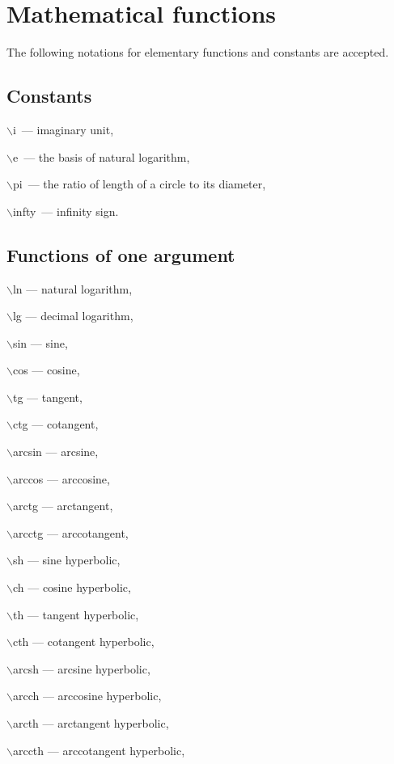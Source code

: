 \section{Mathematical functions}
The following notations for elementary functions and constants are accepted.
\subsection{Constants}  
\hspace*{4mm}  $\backslash$i~--- imaginary unit, 

 $\backslash$e~--- the basis of natural logarithm,  

 $\backslash$pi~--- the ratio of length of a circle to its diameter,    

 $\backslash$infty~--- infinity sign. 


\subsection{Functions of one argument} 

\hspace*{4mm} $\backslash$ln --- natural logarithm, 

 $\backslash$lg --- decimal logarithm, 

 $\backslash$sin --- sine,  

 $\backslash$cos --- cosine,  

 $\backslash$tg --- tangent,  

 $\backslash$ctg --- cotangent, 

 $\backslash$arcsin --- arcsine, 

 $\backslash$arccos --- arccosine,  

 $\backslash$arctg --- arctangent,  

 $\backslash$arcctg --- arccotangent, 

 $\backslash$sh --- sine hyperbolic, 

 $\backslash$ch --- cosine hyperbolic, 

 $\backslash$th --- tangent hyperbolic, 

 $\backslash$cth --- cotangent hyperbolic, 

 $\backslash$arcsh --- arcsine hyperbolic, 

 $\backslash$arcch --- arccosine hyperbolic,  

 $\backslash$arcth --- arctangent hyperbolic, 

 $\backslash$arccth --- arccotangent hyperbolic, 

